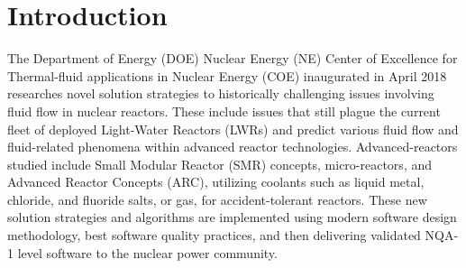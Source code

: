\section{Introduction}
\label{s:intro}

The Department of Energy (DOE) Nuclear Energy (NE) Center of Excellence for Thermal-fluid applications in Nuclear Energy (COE) \cite{shaver2019initial} inaugurated in April 2018 researches novel solution strategies to historically challenging issues involving fluid flow in nuclear reactors. These include issues that still plague the current fleet of deployed Light-Water Reactors (LWRs) and predict various fluid flow and fluid-related phenomena within advanced reactor technologies. Advanced-reactors studied include Small Modular Reactor (SMR) concepts, micro-reactors, and Advanced Reactor Concepts (ARC), utilizing coolants such as liquid metal, chloride, and fluoride salts, or gas, for accident-tolerant reactors. These new solution strategies and algorithms are implemented using modern software design methodology, best software quality practices, and then delivering validated NQA-1 level software to the nuclear power community.

